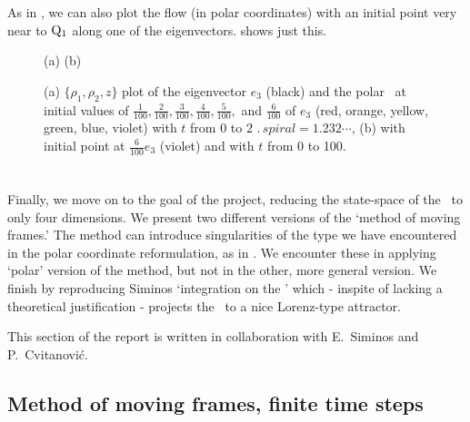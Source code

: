 As in , we can also plot the flow
(in polar coordinates) with an initial point very near to
$\mathrm{Q}_{1}$ along one of the eigenvectors.
 shows just this.
\begin{figure}[h]
\begin{center}
(a) %
(b) %
\end{center}
\caption{
(a) $\{\rho_1, \rho_2, z\}$ plot of the eigenvector $e_3$
(black) and the polar \cLf\ at initial values of
$\frac{1}{100}, \frac{2}{100}, \frac{3}{100}, \frac{4}{100},
\frac{5}{100},$ and $ \frac{6}{100}$ of $e_3$ (red, orange,
yellow, green, blue, violet) with $t$ from 0 to
$2\,\period{spiral}=1.232\cdots$, (b)
with initial point at $ \frac{6}{100} e_3$ (violet) and with
$t$ from 0 to 100.
    }
\label{fig:CLEQ1}
\end{figure}

\section{\Reducedsp}
\label{sect:reducedStateSp}

Finally, we move on to the goal of the project, reducing the
state-space of the \cLe\ to only four dimensions. We present
two different versions of the `method of moving frames.' The
method can introduce singularities of the type we have
encountered in the polar coordinate reformulation, as in
. We encounter these in applying
`polar' version of the method, but not in the other, more
general version. We finish by reproducing Siminos
`integration on the \csection' which - inspite of lacking a
theoretical justification - projects the \cLf\ to a nice
Lorenz-type attractor.

This section of the report is written in collaboration with
E.~Siminos and P.~Cvitanovi\'c.

\subsection{Method of moving frames, finite time steps}
\label{sect:MovFrame}


